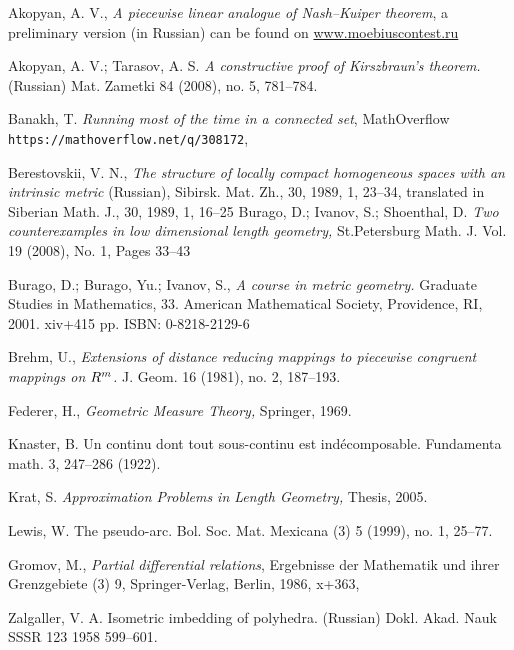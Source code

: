 \documentclass[oneside,a4paper]{article}
\begin{document}
\begin{thebibliography}{52} 
 Akopyan, A. V.,
\textit{A piecewise linear analogue of Nash--Kuiper theorem},
a preliminary version (in Russian) can be found on
\href{http://www.moebiuscontest.ru/files/2007/akopyan.pdf}{www.moebiuscontest.ru}

 Akopyan, A. V.; Tarasov, A. S.
\textit{A constructive proof of Kirszbraun's theorem.} 
(Russian) Mat. Zametki 84 (2008), no. 5, 781--784. 

 Banakh, T. \textit{Running most of the time in a connected set},  MathOverflow   \texttt{https://mathoverflow.net/q/308172},

 Berestovskii, V. N.,
   \textit{The structure of locally compact homogeneous spaces with an
   intrinsic metric} (Russian),
   {Sibirsk. Mat. Zh.},
   {30},
   {1989},
   {1},
   {23--34},
   translated in
   {Siberian Math. J.},
      {30},
      {1989},
      {1},
    {16--25}
 Burago, D.; Ivanov, S.; Shoenthal, D.   \textit{Two counterexamples in low dimensional length geometry,}
St.Petersburg Math. J. Vol. 19 (2008), No. 1, Pages 33--43

 Burago, D.; Burago, Yu.; Ivanov, S., \textit{A course in metric geometry.} Graduate Studies in Mathematics, 33. American Mathematical Society, Providence, RI, 2001. xiv+415 pp. ISBN: 0-8218-2129-6

 Brehm, U., \textit{Extensions of distance reducing mappings to piecewise congruent mappings on $R\sp{m}$.}  J. Geom.  16  (1981), no. 2, 187--193.

 Federer, H., \textit{Geometric Measure Theory,} Springer, 1969.

 Knaster, B. Un continu dont tout sous-continu est ind\'ecomposable. Fundamenta math. 3, 247--286 (1922).

 Krat, S. \textit{Approximation Problems in Length Geometry,} Thesis, 2005.

Lewis, W. The pseudo-arc. Bol. Soc. Mat. Mexicana (3) 5 (1999), no. 1, 25--77.


  Gromov, M.,
\textit{Partial differential relations},
 Ergebnisse der Mathematik und ihrer Grenzgebiete (3) 
{9},
{Springer-Verlag},
 {Berlin},
 {1986},
 {x+363},

 Zalgaller, V. A. Isometric imbedding of polyhedra. (Russian)  Dokl. Akad. Nauk SSSR  123  1958 599--601.

\end{thebibliography}
\end{document}
